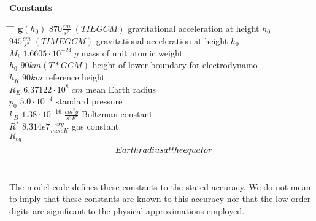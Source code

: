 %
\textbf{\Large{Constants}} 
%        						
\begin{tabbing}
\hspace{5mm} \= \hspace{15mm} \= \hspace{40mm} \=  \kill
%
\>$\mathbf{g}(h_0)$ \>  $870 \frac{cm}{s^2} \;  (TIEGCM)$          \>  gravitational acceleration at height $h_0$   \\
\>                  \>  $945 \frac{cm}{s^2} \; (TIMEGCM)$          \>  gravitational acceleration at height $h_0$   \\
\>$M_i$   	    \>  $1.6605 \cdot 10^{-24} \; g$     \>  mass of unit atomic weight\\
\>$h_0$   	    \>  $90 km(T*GCM)$                   \>  height of lower boundary for 
                                                             electrodynamo \\
\>$h_R$   	    \>  $90 km$                          \>  reference height\\
\>$R_E$             \>  $6.37122 \cdot 10^{8} \; cm$     \>  mean Earth radius   \\
\>$p_0$   	    \>  $5.0\cdot 10^{-4}$               \>  standard pressure\\
\>$k_B$   	    \>  $1.38 \cdot 10^{-16} \; \frac{cm^2g}{s^2 K}$ \> Boltzman constant\\
                  
\>$R^*$             \>  $8.314e7 \frac{erg}{mole K}$ \> gas constant\\
                  
\>$R_{eq}$          \>  $$  \> Earth radius at the equator \\
                  
\>$$   		    \>   \> \\
 
%
\end{tabbing}
%
The model code defines these constants to the stated accuracy. 
We do not mean to imply that these constants are known to this accuracy 
nor that the low-order digits are significant to the physical approximations 
employed. 
